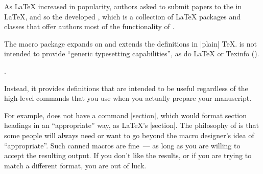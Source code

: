 As \LaTeX{} increased in popularity, authors asked to submit papers to
the  in \LaTeX{}, and so the  developed
\AMSLaTeX{}, which is a
collection of \LaTeX{} packages and classes that offer authors most of
the functionality of \AMSTeX{}.





The \Eplain{} macro package expands on and extends the
definitions in |plain| \TeX{}.  \Eplain{} is not intended to provide
``generic typesetting capabilities'', as do \LaTeX{} or
\htmlignore
Texinfo ().
\endhtmlignore
\begin{htmlversion}
.
\end{htmlversion}
Instead, it provides definitions that are intended to be useful
regardless of the high-level commands that you use when you actually
prepare your manuscript.

For example, \Eplain{} does not have a command \cs|section|,
which would format section headings in an ``appropriate'' way, as
\LaTeX{}'s \cs|section|.  The philosophy of \Eplain{} is that
some people will always need or want to go beyond the macro designer's
idea of ``appropriate''.  Such canned macros are fine~--- as long as you
are willing to accept the resulting output.  If you don't like the
results, or if you are trying to match a different format, you are out
of luck.

